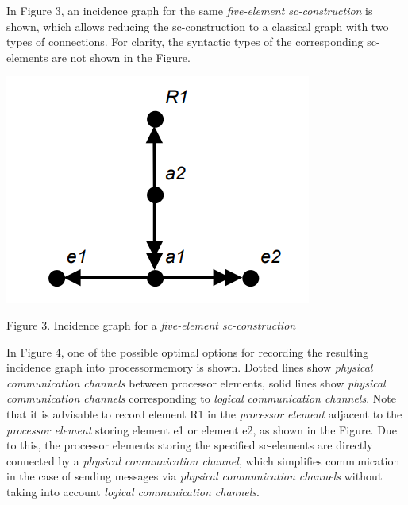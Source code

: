 \documentclass{article}
\begin{document}
{\begin{multicols}{2}
In Figure 3, an incidence graph for the same \textit{five-element sc-construction} is shown, which allows reducing
the sc-construction to a classical graph with two types
of connections. For clarity, the syntactic types of the
corresponding sc-elements are not shown in the Figure.

\begin{center}
    \includegraphics[scale=0.5]{images/aboba.png}
    
    \vspace{+6pt}
    {\small Figure 3. Incidence graph for a \textit{five-element sc-construction}}
\end{center}


In Figure 4, one of the possible optimal options for
recording the resulting incidence graph into   processormemory is shown. Dotted lines show \textit{physical communication channels} between processor elements, solid lines  
show \textit{physical communication channels} corresponding to
\textit{logical communication channels}.  Note that it is advisable
to record element R1 in the \textit{processor element} adjacent  to the \textit{processor element} storing  element e1 or element e2, as shown in the Figure. Due to this, the processor
elements storing the specified sc-elements are directly
connected by a \textit{physical communication channel}, which
simplifies communication in the case of sending messages
via \textit{physical communication channels} without taking into
account \textit{logical communication channels}.


\end{multicols}}
\end{document}
